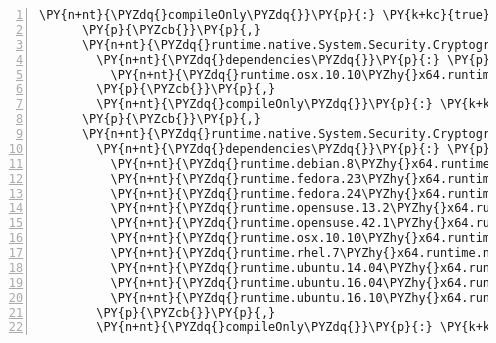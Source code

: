 \begin{Verbatim}[commandchars=\\\{\},numbers=left,firstnumber=1,stepnumber=1,numberblanklines=0]
        \PY{n+nt}{\PYZdq{}compileOnly\PYZdq{}}\PY{p}{:} \PY{k+kc}{true}
      \PY{p}{\PYZcb{}}\PY{p}{,}
      \PY{n+nt}{\PYZdq{}runtime.native.System.Security.Cryptography.Apple/4.3.0\PYZdq{}}\PY{p}{:} \PY{p}{\PYZob{}}
        \PY{n+nt}{\PYZdq{}dependencies\PYZdq{}}\PY{p}{:} \PY{p}{\PYZob{}}
          \PY{n+nt}{\PYZdq{}runtime.osx.10.10\PYZhy{}x64.runtime.native.System.Security.Cryptography.Apple\PYZdq{}}\PY{p}{:} \PY{l+s+s2}{\PYZdq{}4.3.0\PYZdq{}}
        \PY{p}{\PYZcb{}}\PY{p}{,}
        \PY{n+nt}{\PYZdq{}compileOnly\PYZdq{}}\PY{p}{:} \PY{k+kc}{true}
      \PY{p}{\PYZcb{}}\PY{p}{,}
      \PY{n+nt}{\PYZdq{}runtime.native.System.Security.Cryptography.OpenSsl/4.3.0\PYZdq{}}\PY{p}{:} \PY{p}{\PYZob{}}
        \PY{n+nt}{\PYZdq{}dependencies\PYZdq{}}\PY{p}{:} \PY{p}{\PYZob{}}
          \PY{n+nt}{\PYZdq{}runtime.debian.8\PYZhy{}x64.runtime.native.System.Security.Cryptography.OpenSsl\PYZdq{}}\PY{p}{:} \PY{l+s+s2}{\PYZdq{}4.3.0\PYZdq{}}\PY{p}{,}
          \PY{n+nt}{\PYZdq{}runtime.fedora.23\PYZhy{}x64.runtime.native.System.Security.Cryptography.OpenSsl\PYZdq{}}\PY{p}{:} \PY{l+s+s2}{\PYZdq{}4.3.0\PYZdq{}}\PY{p}{,}
          \PY{n+nt}{\PYZdq{}runtime.fedora.24\PYZhy{}x64.runtime.native.System.Security.Cryptography.OpenSsl\PYZdq{}}\PY{p}{:} \PY{l+s+s2}{\PYZdq{}4.3.0\PYZdq{}}\PY{p}{,}
          \PY{n+nt}{\PYZdq{}runtime.opensuse.13.2\PYZhy{}x64.runtime.native.System.Security.Cryptography.OpenSsl\PYZdq{}}\PY{p}{:} \PY{l+s+s2}{\PYZdq{}4.3.0\PYZdq{}}\PY{p}{,}
          \PY{n+nt}{\PYZdq{}runtime.opensuse.42.1\PYZhy{}x64.runtime.native.System.Security.Cryptography.OpenSsl\PYZdq{}}\PY{p}{:} \PY{l+s+s2}{\PYZdq{}4.3.0\PYZdq{}}\PY{p}{,}
          \PY{n+nt}{\PYZdq{}runtime.osx.10.10\PYZhy{}x64.runtime.native.System.Security.Cryptography.OpenSsl\PYZdq{}}\PY{p}{:} \PY{l+s+s2}{\PYZdq{}4.3.0\PYZdq{}}\PY{p}{,}
          \PY{n+nt}{\PYZdq{}runtime.rhel.7\PYZhy{}x64.runtime.native.System.Security.Cryptography.OpenSsl\PYZdq{}}\PY{p}{:} \PY{l+s+s2}{\PYZdq{}4.3.0\PYZdq{}}\PY{p}{,}
          \PY{n+nt}{\PYZdq{}runtime.ubuntu.14.04\PYZhy{}x64.runtime.native.System.Security.Cryptography.OpenSsl\PYZdq{}}\PY{p}{:} \PY{l+s+s2}{\PYZdq{}4.3.0\PYZdq{}}\PY{p}{,}
          \PY{n+nt}{\PYZdq{}runtime.ubuntu.16.04\PYZhy{}x64.runtime.native.System.Security.Cryptography.OpenSsl\PYZdq{}}\PY{p}{:} \PY{l+s+s2}{\PYZdq{}4.3.0\PYZdq{}}\PY{p}{,}
          \PY{n+nt}{\PYZdq{}runtime.ubuntu.16.10\PYZhy{}x64.runtime.native.System.Security.Cryptography.OpenSsl\PYZdq{}}\PY{p}{:} \PY{l+s+s2}{\PYZdq{}4.3.0\PYZdq{}}
        \PY{p}{\PYZcb{}}\PY{p}{,}
        \PY{n+nt}{\PYZdq{}compileOnly\PYZdq{}}\PY{p}{:} \PY{k+kc}{true}

\end{Verbatim}
